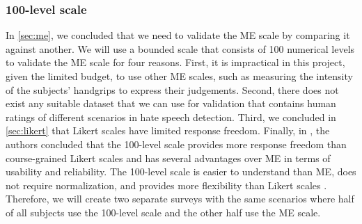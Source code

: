 \subsubsection{100-level scale}
In \ref{sec:me}, we concluded that we need to validate the ME scale by comparing it against another. We will use a bounded scale that consists of 100 numerical levels to validate the ME scale for four reasons. First, it is impractical in this project, given the limited budget, to use other ME scales, such as measuring the intensity of the subjects' handgrips to express their judgements. Second, there does not exist any suitable dataset that we can use for validation that contains human ratings of different scenarios in hate speech detection. Third, we concluded in \ref{sec:likert} that Likert scales have limited response freedom. Finally, in \cite{roitero2018fine}, the authors concluded that the 100-level scale provides more response freedom than course-grained Likert scales and has several advantages over ME in terms of usability and reliability. The 100-level scale is easier to understand than ME, does not require normalization, and provides more flexibility than Likert scales \cite{roitero2018fine}. Therefore, we will create two separate surveys with the same scenarios where half of all subjects use the 100-level scale and the other half use the ME scale.

